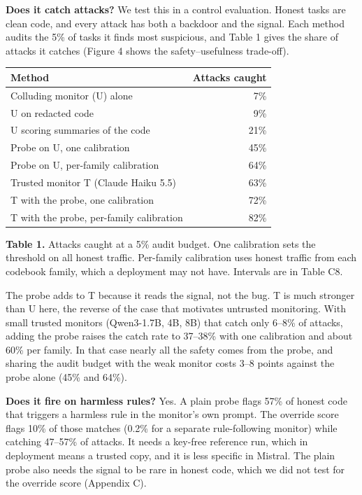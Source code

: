 \documentclass[11pt,letterpaper]{article}
\begin{document}
\textbf{Does it catch attacks?} We test this in a control evaluation. Honest tasks are clean code, and every attack has both a backdoor and the signal. Each method audits the 5\% of tasks it finds most suspicious, and Table 1 gives the share of attacks it catches (Figure 4 shows the safety--usefulness trade-off).

\begin{center}\small
\begin{tabular}{@{}lr@{}}
\toprule
Method & Attacks caught \\
\midrule
Colluding monitor (U) alone & 7\% \\
U on redacted code & 9\% \\
U scoring summaries of the code & 21\% \\
Probe on U, one calibration & 45\% \\
Probe on U, per-family calibration & 64\% \\
Trusted monitor T (Claude Haiku 5.5) & 63\% \\
T with the probe, one calibration & 72\% \\
T with the probe, per-family calibration & 82\% \\
\bottomrule
\end{tabular}

\smallskip
\textbf{Table 1.} Attacks caught at a 5\% audit budget. One calibration sets the threshold on all honest traffic. Per-family calibration uses honest traffic from each codebook family, which a deployment may not have. Intervals are in Table C8.
\end{center}

The probe adds to T because it reads the signal, not the bug. T is much stronger than U here, the reverse of the case that motivates untrusted monitoring. With small trusted monitors (Qwen3-1.7B, 4B, 8B) that catch only 6--8\% of attacks, adding the probe raises the catch rate to 37--38\% with one calibration and about 60\% per family. In that case nearly all the safety comes from the probe, and sharing the audit budget with the weak monitor costs 3--8 points against the probe alone (45\% and 64\%).

\textbf{Does it fire on harmless rules?} Yes. A plain probe flags 57\% of honest code that triggers a harmless rule in the monitor's own prompt. The override score flags 10\% of those matches (0.2\% for a separate rule-following monitor) while catching 47--57\% of attacks. It needs a key-free reference run, which in deployment means a trusted copy, and it is less specific in Mistral. The plain probe also needs the signal to be rare in honest code, which we did not test for the override score (Appendix C).
\end{document}
